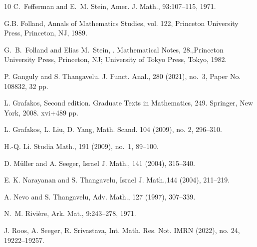 \documentclass[11pt]{amsart}
\theoremstyle{definition}
\numberwithin{equation}{section}
\begin{document}
\begin{thebibliography}{10}
C.~Fefferman and E.~M. Stein,
Amer. J. Math., 93:107--115, 1971.


 G.B. Folland,  Annals of Mathematics Studies, vol. 122, Princeton
University Press, Princeton, NJ, 1989.

G.~B.~Folland and  Elias M.~Stein,
. Mathematical Notes, 28.,Princeton University Press, Princeton, NJ; University of Tokyo Press, Tokyo, 1982.

P. Ganguly and S. Thangavelu. 
 J. Funct. Anal., 280 (2021), no.~3, Paper No. 108832, 32 pp.
  

L. Grafakos,  Second edition. Graduate Texts in Mathematics, 249. Springer, New York, 2008. xvi+489 pp.


L. Grafakos, L. Liu, D. Yang,
 Math. Scand. 104 (2009), no. 2, 296--310.


H.-Q. Li.  Studia Math., 191 (2009), no.~1, 89--100.



 D. M\"uller and A. Seeger, 
Israel J. Math., 141 (2004), 315--340.

E. K. Narayanan and S. Thangavelu, 
Israel J. Math.,144 (2004), 211--219.

 A. Nevo and S. Thangavelu, 
Adv. Math., 127 (1997), 307--339.



N.~M. Rivi\`ere,
 Ark. Mat., 9:243--278, 1971.

J. Roos, A. Seeger, R. Srivastava,  Int. Math. Res. Not. IMRN (2022), no. 24, 19222--19257.



\end{thebibliography}
\end{document}

